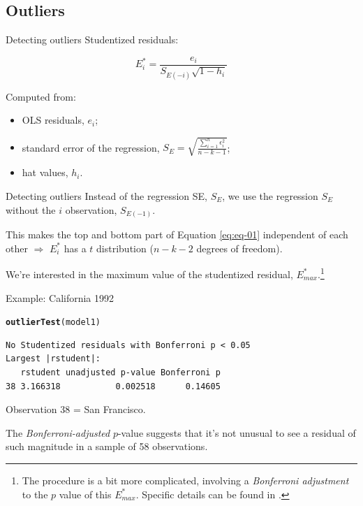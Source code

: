 \documentclass[12pt,english,pdf,xcolor=dvipsnames,aspectratio=169,handout]{beamer}\usepackage[]{graphicx}\usepackage[]{xcolor}
\makeatletter
\newcommand{\hlstd}[1]{\textcolor[rgb]{0.345,0.345,0.345}{#1}}%
\newcommand{\hlkwd}[1]{\textcolor[rgb]{0.737,0.353,0.396}{\textbf{#1}}}%
\newenvironment{kframe}{%
 \def\at@end@of@kframe{}%
 \ifinner\ifhmode%
  \def\at@end@of@kframe{\end{minipage}}%
  \begin{minipage}{\columnwidth}%
 \fi\fi%
 \def\FrameCommand##1{\hskip\@totalleftmargin \hskip-\fboxsep
 \colorbox{shadecolor}{##1}\hskip-\fboxsep
     \hskip-\linewidth \hskip-\@totalleftmargin \hskip\columnwidth}%
 \MakeFramed {\advance\hsize-\width
   \@totalleftmargin\z@ \linewidth\hsize
   \@setminipage}}%
 {\par\unskip\endMakeFramed%
 \at@end@of@kframe}
\newenvironment{knitrout}{}{} %
\makeatother
\begin{document}
\subsection{Outliers}

\begin{frame}{Detecting outliers}
  Studentized residuals:

  \begin{equation}
  E_i^* = \frac{e_i}{S_{E(-i)}\sqrt{1-h_i}}
  \label{eq:eq-01}
  \end{equation}

  Computed from:

  \begin{itemize}
  \item OLS residuals, $e_i$;
  \item standard error of the regression, $S_E = \sqrt{\frac{\sum_{i=1}^n\epsilon_i^2}{n-k-1}}$;
  \item hat values, $h_i$.
  \end{itemize}
\end{frame}



\begin{frame}{Detecting outliers}
  Instead of the regression SE, $S_E$, we use the regression $S_E$ without the $i$ observation, $S_{E(-1)}$.\bigskip

  This makes the top and bottom part of Equation \ref{eq:eq-01} independent of each other $\Rightarrow$ $E_i^*$ has a $t$ distribution ($n-k-2$ degrees of freedom).\bigskip

  We're interested in the maximum value of the studentized residual, $E_{max}^*$.\footnote{The procedure is a bit more complicated, involving a \textit{Bonferroni adjustment} to the $p$ value of this $E_{max}^*$. Specific details can be found in .}
\end{frame}



\begin{frame}[fragile]{Example: California 1992}

\begin{knitrout}\footnotesize
{}\color{fgcolor}\begin{kframe}
\begin{alltt}
\hlkwd{outlierTest}\hlstd{(model1)}
\end{alltt}
\begin{verbatim}
No Studentized residuals with Bonferroni p < 0.05
Largest |rstudent|:
   rstudent unadjusted p-value Bonferroni p
38 3.166318           0.002518      0.14605
\end{verbatim}
\end{kframe}
\end{knitrout}

Observation 38 = San Francisco.\bigskip

The \textit{Bonferroni-adjusted} $p$-value suggests that it's not unusual to see a residual of such magnitude in a sample of 58 observations.
\end{frame}
\end{document}
